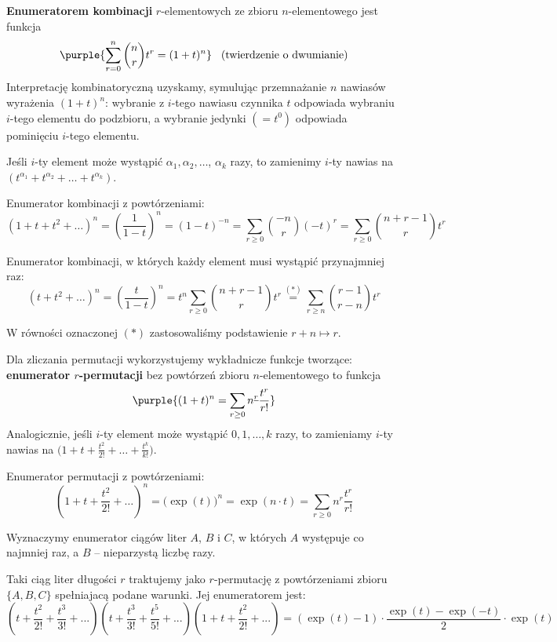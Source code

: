 \textbf{Enumeratorem kombinacji} $r$-elementowych ze zbioru $n$-elementowego jest funkcja
$$\purple{\sum_{r = 0}^n \binom{n}{r} t^r = (1 + t)^n} \hspace{0.3cm} \text{(twierdzenie o dwumianie)}$$
Interpretację kombinatoryczną uzyskamy, symulując przemnażanie $n$ nawiasów wyrażenia $(1 + t)^n$: wybranie z $i$-tego nawiasu czynnika $t$ odpowiada wybraniu $i$-tego elementu do podzbioru, a wybranie jedynki $(= t^0)$ odpowiada pominięciu $i$-tego elementu.

Jeśli $i$-ty element może wystąpić $\alpha_1, \alpha_2, \dots$, $\alpha_k$ razy, to zamienimy $i$-ty nawias na 
$(t^{\alpha_1} + t^{\alpha_2} + \dots + t^{\alpha_k})$.

\begin{example}
    Enumerator kombinacji z powtórzeniami:
    $$(1 + t + t^2 + \dots)^n = \left( \frac{1}{1 - t} \right)^n = 
    (1 - t)^{-n} = \sum_{r \geq 0} \binom{-n}{r} (-t)^r = \sum_{r \geq 0} \binom{n + r - 1}{r} t^r $$
\end{example}

\begin{example}
    Enumerator kombinacji, w których każdy element musi wystąpić przynajmniej raz:
    $$(t + t^2 + \dots)^n = \left( \frac{t}{1 - t} \right)^n = t^n \sum_{r \geq 0} \binom{n + r - 1}{r} t^r \overset{(*)}{=} \sum_{r \geq n} \binom{r - 1}{r - n} t^r $$

    W równości oznaczonej $(*)$ zastosowaliśmy podstawienie $r + n \mapsto r$.
\end{example}

Dla zliczania permutacji wykorzystujemy wykładnicze funkcje tworzące: \textbf{enumerator $r$-permutacji} bez powtórzeń zbioru $n$-elementowego to funkcja 
$$\purple{(1 + t)^n = \sum_{r \geq 0} n^{\underline r} \frac{t^r}{r!}}$$
Analogicznie, jeśli $i$-ty element może wystąpić $0, 1, \dots, k$ razy, to zamieniamy
$i$-ty nawias na $\Big(1 + t + \frac{t^2}{2!} + \dots + \frac{t^k}{k!}\Big)$.

\begin{example}
    Enumerator permutacji z powtórzeniami:
    $$\left(1 + t + \frac{t^2}{2!} + \dots\right)^n = \big(\exp(t)\big)^n = \exp(n \cdot t) = 
    \sum_{r \geq 0} n^r \frac{t^r}{r!}$$
\end{example}

\begin{example}
    Wyznaczymy enumerator ciągów liter $A$, $B$ i $C$, w których $A$ występuje co najmniej raz, a $B$ -- nieparzystą liczbę razy.
    
    Taki ciąg liter długości $r$ traktujemy jako $r$-permutację z powtórzeniami zbioru $\{A, B, C\}$ spełniajacą podane warunki. Jej enumeratorem jest:
    $$\left(t + \frac{t^2}{2!} + \frac{t^3}{3!} + ...\right)\left(t + \frac{t^3}{3!} + \frac{t^5}{5!} + ...\right)\left(1 + t + \frac{t^2}{2!} + ...\right) = (\exp(t) - 1)\cdot \frac{\exp(t) - \exp(-t)}{2} \cdot \exp(t)$$
\end{example}

